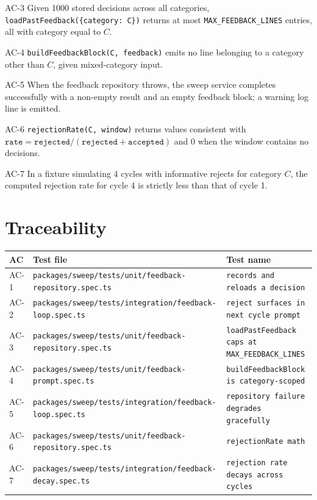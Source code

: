 \begin{ac}{AC-3}
Given 1000 stored decisions across all categories, \texttt{loadPastFeedback(\{category: C\})} returns at most \texttt{MAX\_FEEDBACK\_LINES} entries, all with category equal to $C$.
\end{ac}

\begin{ac}{AC-4}
\texttt{buildFeedbackBlock(C, feedback)} emits no line belonging to a category other than $C$, given mixed-category input.
\end{ac}

\begin{ac}{AC-5}
When the feedback repository throws, the sweep service completes successfully with a non-empty result and an empty feedback block; a warning log line is emitted.
\end{ac}

\begin{ac}{AC-6}
\texttt{rejectionRate(C, window)} returns values consistent with $\texttt{rate} = \texttt{rejected} / (\texttt{rejected} + \texttt{accepted})$ and $0$ when the window contains no decisions.
\end{ac}

\begin{ac}{AC-7}
In a fixture simulating 4 cycles with informative rejects for category $C$, the computed rejection rate for cycle 4 is strictly less than that of cycle 1.
\end{ac}

\section{Traceability}

\begin{center}
\begin{tabular}{@{}lll@{}}
\toprule
AC & Test file & Test name \\
\midrule
AC-1 & \texttt{packages/sweep/tests/unit/feedback-repository.spec.ts} & \texttt{records and reloads a decision} \\
AC-2 & \texttt{packages/sweep/tests/integration/feedback-loop.spec.ts} & \texttt{reject surfaces in next cycle prompt} \\
AC-3 & \texttt{packages/sweep/tests/unit/feedback-repository.spec.ts} & \texttt{loadPastFeedback caps at MAX\_FEEDBACK\_LINES} \\
AC-4 & \texttt{packages/sweep/tests/unit/feedback-prompt.spec.ts} & \texttt{buildFeedbackBlock is category-scoped} \\
AC-5 & \texttt{packages/sweep/tests/integration/feedback-loop.spec.ts} & \texttt{repository failure degrades gracefully} \\
AC-6 & \texttt{packages/sweep/tests/unit/feedback-repository.spec.ts} & \texttt{rejectionRate math} \\
AC-7 & \texttt{packages/sweep/tests/integration/feedback-decay.spec.ts} & \texttt{rejection rate decays across cycles} \\
\bottomrule
\end{tabular}
\end{center}

